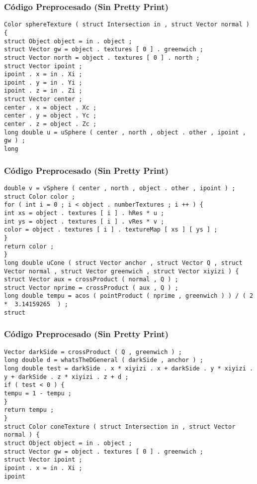 \documentclass{beamer}
\begin{document}
\begin{frame}[fragile]
\frametitle{C\'odigo Preprocesado (Sin Pretty Print)}
\begin{lstlisting}[style=CStyle]
Color sphereTexture ( struct Intersection in , struct Vector normal ) { 
struct Object object = in . object ; 
struct Vector gw = object . textures [ 0 ] . greenwich ; 
struct Vector north = object . textures [ 0 ] . north ; 
struct Vector ipoint ; 
ipoint . x = in . Xi ; 
ipoint . y = in . Yi ; 
ipoint . z = in . Zi ; 
struct Vector center ; 
center . x = object . Xc ; 
center . y = object . Yc ; 
center . z = object . Zc ; 
long double u = uSphere ( center , north , object . other , ipoint , gw ) ; 
long \end{lstlisting}
\end{frame}
\begin{frame}[fragile]
\frametitle{C\'odigo Preprocesado (Sin Pretty Print)}
\begin{lstlisting}[style=CStyle]
double v = vSphere ( center , north , object . other , ipoint ) ; 
struct Color color ; 
for ( int i = 0 ; i < object . numberTextures ; i ++ ) { 
int xs = object . textures [ i ] . hRes * u ; 
int ys = object . textures [ i ] . vRes * v ; 
color = object . textures [ i ] . textureMap [ xs ] [ ys ] ; 
} 
return color ; 
} 
long double uCone ( struct Vector anchor , struct Vector Q , struct Vector normal , struct Vector greenwich , struct Vector xiyizi ) { 
struct Vector aux = crossProduct ( normal , Q ) ; 
struct Vector nprime = crossProduct ( aux , Q ) ; 
long double tempu = acos ( pointProduct ( nprime , greenwich ) ) / ( 2 *  3.14159265  ) ; 
struct \end{lstlisting}
\end{frame}
\begin{frame}[fragile]
\frametitle{C\'odigo Preprocesado (Sin Pretty Print)}
\begin{lstlisting}[style=CStyle]
Vector darkSide = crossProduct ( Q , greenwich ) ; 
long double d = whatsTheDGeneral ( darkSide , anchor ) ; 
long double test = darkSide . x * xiyizi . x + darkSide . y * xiyizi . y + darkSide . z * xiyizi . z + d ; 
if ( test < 0 ) { 
tempu = 1 - tempu ; 
} 
return tempu ; 
} 
struct Color coneTexture ( struct Intersection in , struct Vector normal ) { 
struct Object object = in . object ; 
struct Vector gw = object . textures [ 0 ] . greenwich ; 
struct Vector ipoint ; 
ipoint . x = in . Xi ; 
ipoint \end{lstlisting}
\end{frame}
\end{document}

